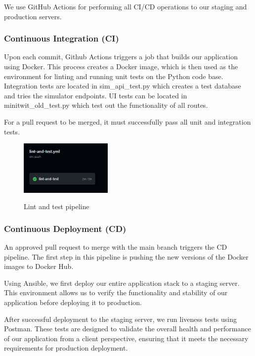 \documentclass{article}
\begin{document}
We use GitHub Actions for performing all CI/CD operations to our staging and production servers.

\subsubsection{Continuous Integration (CI)}

Upon each commit, Github Actions triggers a job that builds our application using Docker. This process creates a Docker image, which is then used as the environment for linting and running unit tests on the Python code base. Integration tests are located in sim\_api\_test.py which creates a test database and tries the simulator endpoints.
UI tests can be located in minitwit\_old\_test.py which test out the functionality of all routes.



For a pull request to be merged, it must successfully pass all unit and integration tests.
\begin{figure}[h]
    \includegraphics[width=0.4\textwidth]{images/Test_pipeline.png}
    \label{fig:ci_pipeline}
    \centering
    \caption{Lint and test pipeline}
\end{figure}
    

\subsubsection{Continuous Deployment (CD)}

An approved pull request to merge with the main branch triggers the CD pipeline. The first step in this pipeline is pushing the new versions of the Docker images to Docker Hub. 

Using Ansible, we first deploy our entire application stack to a staging server. This environment allows us to verify the functionality and stability of our application before deploying it to production.

After successful deployment to the staging server, we run liveness tests using Postman. These tests are designed to validate the overall health and performance of our application from a client perspective, ensuring that it meets the necessary requirements for production deployment. 
\end{document}
